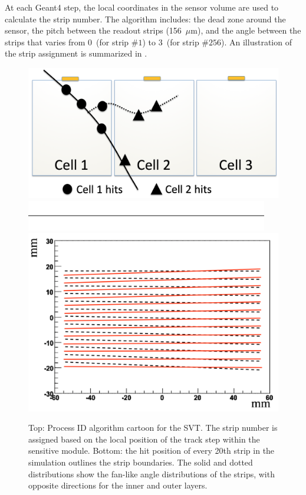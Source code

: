 At each Geant4 step, the local coordinates in the sensor volume are used to calculate the strip number. The algorithm
includes: the dead zone around the sensor, the pitch between the readout strips (156~$\mu$m), and the angle
between the strips that varies from 0\mdeg \ (for strip $\# 1$) to 3\mdeg \ (for strip  $\# 256$).
An illustration of the strip assignment is summarized in .

\begin{figure}[ht]
	\centering
	\includegraphics[width=0.99\columnwidth,keepaspectratio]{img/bstHit.png}
	\includegraphics[width=0.99\columnwidth,keepaspectratio]{img/blank.png}
	\includegraphics[width=0.99\columnwidth,keepaspectratio]{img/bstStrip.png}
	\caption{Top: Process ID algorithm cartoon for the SVT. The strip number is assigned based on the local position of
          the track step within the sensitive module. Bottom: the hit position of every 20th strip in the simulation outlines
          the strip boundaries. The solid and dotted distributions show the fan-like angle distributions of the strips, with
          opposite directions for the inner and outer layers. }
	\label{fig:processID}
\end{figure}

